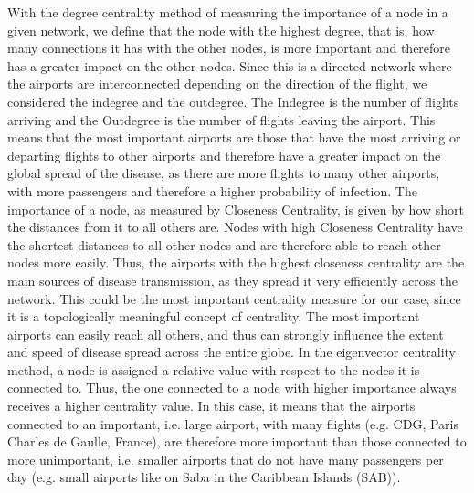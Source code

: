 \documentclass{Resources/netsci-project}
\begin{document}
With the degree centrality method of measuring the importance of a node in a given network, we define that the node with the highest degree, that is, how many connections it has with the other nodes, is more important and therefore has a greater impact on the other nodes. Since this is a directed network where the airports are interconnected depending on the direction of the flight, we considered the indegree and the outdegree. The Indegree is the number of flights arriving and the Outdegree is the number of flights leaving the airport. This means that the most important airports are those that have the most arriving or departing flights to other airports and therefore have a greater impact on the global spread of the disease, as there are more flights to many other airports, with more passengers and therefore a higher probability of infection.
The importance of a node, as measured by Closeness Centrality, is given by how short the distances from it to all others are. Nodes with high Closeness Centrality have the shortest distances to all other nodes and are therefore able to reach other nodes more easily. Thus, the airports with the highest closeness centrality are the main sources of disease transmission, as they spread it very efficiently across the network. This could be the most important centrality measure for our case, since it is a topologically meaningful concept of centrality. The most important airports can easily reach all others, and thus can strongly influence the extent and speed of disease spread across the entire globe.
In the eigenvector centrality method, a node is assigned a relative value with respect to the nodes it is connected to. Thus, the one connected to a node with higher importance always receives a higher centrality value. In this case, it means that the airports connected to an important, i.e. large airport, with many flights (e.g. CDG, Paris Charles de Gaulle, France), are therefore more important than those connected to more unimportant, i.e. smaller airports that do not have many passengers per day (e.g. small airports like on Saba in the Caribbean Islands (SAB)).
\end{document}
